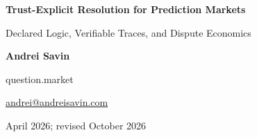 \documentclass[10pt]{article}
\begin{document}
\begin{center}
{\LARGE\bfseries Trust-Explicit Resolution for Prediction Markets\par}
\vspace{0.4em}
{\large Declared Logic, Verifiable Traces, and Dispute Economics\par}
\vspace{1.2em}
{\normalsize\bfseries Andrei Savin\par}
\vspace{0.3em}
{\small question.market\par}
{\small\href{mailto:andrei@andreisavin.com}{andrei@andreisavin.com}\par}
\vspace{0.6em}
{\small April 2026; revised October 2026\par}
\end{center}

\vspace{0.8em}
\end{document}

